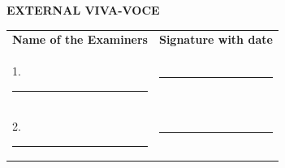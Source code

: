 \vfill

\begin{center}
{\fontsize{13pt}{16pt}\selectfont \textbf{EXTERNAL VIVA-VOCE}}
\end{center}

\vspace{0.35cm}
\noindent
\begin{tabular}{@{}ll@{}}
\textbf{Name of the Examiners} \hspace{4.2cm} & \textbf{Signature with date} \\[0.75cm]
1. \rule{4.8cm}{0.5pt} & \rule{4.8cm}{0.5pt} \\[0.75cm]
2. \rule{4.8cm}{0.5pt} & \rule{4.8cm}{0.5pt}
\end{tabular}

\vspace*{0.1cm}